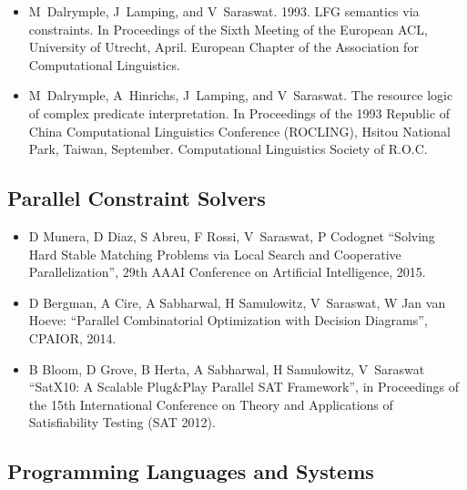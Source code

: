 \documentclass{article}
\begin{document}
\begin{itemize}
\item  M~Dalrymple, J~Lamping, and V~Saraswat. 1993.
    LFG semantics via constraints. In Proceedings of the Sixth
    Meeting of the European ACL, University of Utrecht, April.
    European Chapter of the Association for Computational
    Linguistics. 
    
\item    M~Dalrymple, A~Hinrichs, J~Lamping, and V~Saraswat.
    The resource logic of complex predicate interpretation.
    In Proceedings of the 1993 Republic of China Computational
    Linguistics Conference (ROCLING), Hsitou National Park,
    Taiwan, September. Computational Linguistics Society of R.O.C.
\end{itemize}

\subsection*{Parallel Constraint Solvers}
\begin{itemize}
\item D Munera, D Diaz, S Abreu, F Rossi, V~Saraswat, P Codognet
  ``Solving Hard Stable Matching Problems via Local Search and
  Cooperative Parallelization'', 29th AAAI Conference on Artificial
  Intelligence, 2015. 

\item D Bergman, A Cire, A Sabharwal, H Samulowitz, V~Saraswat, W Jan van Hoeve: ``Parallel Combinatorial Optimization with
  Decision Diagrams'', CPAIOR, 2014.

\item B Bloom, D Grove, B Herta, A Sabharwal, H Samulowitz, V~Saraswat ``SatX10: A Scalable Plug\&Play Parallel
  SAT Framework'',  in Proceedings of the 15th International Conference on Theory and Applications of
Satisfiability Testing (SAT 2012).   

\end{itemize}

\subsection*{Programming Languages and Systems}
\end{document}
